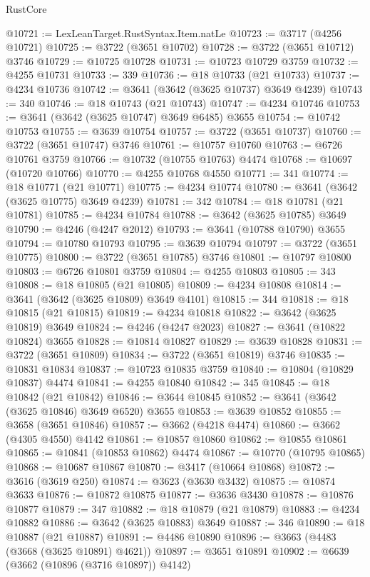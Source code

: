 \begin{lexlean}{RustCore}
\begin{coremodule}
@10721 := LexLeanTarget.RustSyntax.Item.natLe
@10723 := @3717 (@4256 @10721)
@10725 := @3722 (@3651 @10702)
@10728 := @3722 (@3651 @10712) @3746
@10729 := @10725 @10728
@10731 := @10723 @10729 @3759
@10732 := @4255 @10731
@10733 := 339
@10736 := @18 @10733 (@21 @10733)
@10737 := @4234 @10736
@10742 := @3641 (@3642 (@3625 @10737) @3649 @4239)
@10743 := 340
@10746 := @18 @10743 (@21 @10743)
@10747 := @4234 @10746
@10753 := @3641 (@3642 (@3625 @10747) @3649 @6485) @3655
@10754 := @10742 @10753
@10755 := @3639 @10754
@10757 := @3722 (@3651 @10737)
@10760 := @3722 (@3651 @10747) @3746
@10761 := @10757 @10760
@10763 := @6726 @10761 @3759
@10766 := @10732 (@10755 @10763) @4474
@10768 := @10697 (@10720 @10766)
@10770 := @4255 @10768 @4550
@10771 := 341
@10774 := @18 @10771 (@21 @10771)
@10775 := @4234 @10774
@10780 := @3641 (@3642 (@3625 @10775) @3649 @4239)
@10781 := 342
@10784 := @18 @10781 (@21 @10781)
@10785 := @4234 @10784
@10788 := @3642 (@3625 @10785) @3649
@10790 := @4246 (@4247 @2012)
@10793 := @3641 (@10788 @10790) @3655
@10794 := @10780 @10793
@10795 := @3639 @10794
@10797 := @3722 (@3651 @10775)
@10800 := @3722 (@3651 @10785) @3746
@10801 := @10797 @10800
@10803 := @6726 @10801 @3759
@10804 := @4255 @10803
@10805 := 343
@10808 := @18 @10805 (@21 @10805)
@10809 := @4234 @10808
@10814 := @3641 (@3642 (@3625 @10809) @3649 @4101)
@10815 := 344
@10818 := @18 @10815 (@21 @10815)
@10819 := @4234 @10818
@10822 := @3642 (@3625 @10819) @3649
@10824 := @4246 (@4247 @2023)
@10827 := @3641 (@10822 @10824) @3655
@10828 := @10814 @10827
@10829 := @3639 @10828
@10831 := @3722 (@3651 @10809)
@10834 := @3722 (@3651 @10819) @3746
@10835 := @10831 @10834
@10837 := @10723 @10835 @3759
@10840 := @10804 (@10829 @10837) @4474
@10841 := @4255 @10840
@10842 := 345
@10845 := @18 @10842 (@21 @10842)
@10846 := @3644 @10845
@10852 := @3641 (@3642 (@3625 @10846) @3649 @6520) @3655
@10853 := @3639 @10852
@10855 := @3658 (@3651 @10846)
@10857 := @3662 (@4218 @4474)
@10860 := @3662 (@4305 @4550) @4142
@10861 := @10857 @10860
@10862 := @10855 @10861
@10865 := @10841 (@10853 @10862) @4474
@10867 := @10770 (@10795 @10865)
@10868 := @10687 @10867
@10870 := @3417 (@10664 @10868)
@10872 := @3616 (@3619 @250)
@10874 := @3623 (@3630 @3432)
@10875 := @10874 @3633
@10876 := @10872 @10875
@10877 := @3636 @3430
@10878 := @10876 @10877
@10879 := 347
@10882 := @18 @10879 (@21 @10879)
@10883 := @4234 @10882
@10886 := @3642 (@3625 @10883) @3649
@10887 := 346
@10890 := @18 @10887 (@21 @10887)
@10891 := @4486 @10890
@10896 := @3663 (@4483 (@3668 (@3625 @10891) @4621))
@10897 := @3651 @10891
@10902 := @6639 (@3662 (@10896 (@3716 @10897)) @4142)

\end{coremodule}
\end{lexlean}
